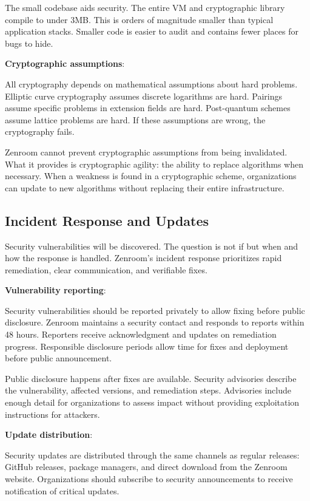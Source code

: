The small codebase aids security. The entire VM and cryptographic
library compile to under 3MB. This is orders of magnitude smaller than
typical application stacks. Smaller code is easier to audit and
contains fewer places for bugs to hide.

\textbf{Cryptographic assumptions}:

All cryptography depends on mathematical assumptions about hard
problems. Elliptic curve cryptography assumes discrete logarithms are
hard. Pairings assume specific problems in extension fields are
hard. Post-quantum schemes assume lattice problems are hard. If these
assumptions are wrong, the cryptography fails.

Zenroom cannot prevent cryptographic assumptions from being
invalidated. What it provides is cryptographic agility: the ability to
replace algorithms when necessary. When a weakness is found in a
cryptographic scheme, organizations can update to new algorithms
without replacing their entire infrastructure.

\subsection{Incident Response and Updates}

Security vulnerabilities will be discovered. The question is not if
but when and how the response is handled. Zenroom's incident response
prioritizes rapid remediation, clear communication, and verifiable
fixes.

\textbf{Vulnerability reporting}:

Security vulnerabilities should be reported privately to allow fixing
before public disclosure. Zenroom maintains a security contact and
responds to reports within 48 hours. Reporters receive acknowledgment
and updates on remediation progress. Responsible disclosure periods
allow time for fixes and deployment before public announcement.

Public disclosure happens after fixes are available. Security
advisories describe the vulnerability, affected versions, and
remediation steps. Advisories include enough detail for organizations
to assess impact without providing exploitation instructions for
attackers.

\textbf{Update distribution}:

Security updates are distributed through the same channels as regular
releases: GitHub releases, package managers, and direct download from
the Zenroom website. Organizations should subscribe to security
announcements to receive notification of critical updates.


